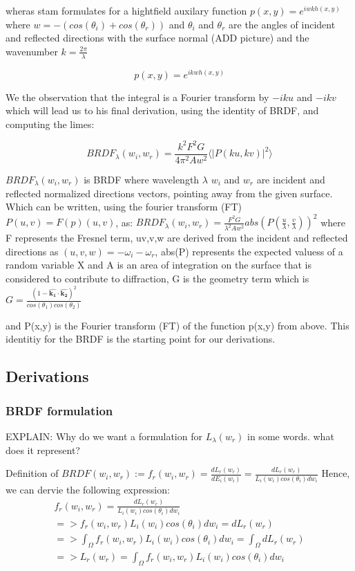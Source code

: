 wheras stam formulates for a hightfield auxilary function $p(x,y) = e^{iwkh(x,y)}$ where $w = -(cos(\theta_i)+cos(\theta_r))$ and $\theta_i$ and $\theta_r$ are the angles of incident and reflected directions with the surface normal (ADD picture) and the wavenumber $k=\frac{2\pi}{\lambda}$

\begin{equation}
    p(x,y) = e^{ikwh(x,y)}
\end{equation}

We the observation that the integral is a Fourier transform by $-iku$ and $-ikv$
which will lead us to his final derivation, using the identity of BRDF, and computing the limes:

\begin{equation}
    BRDF_{\lambda}(w_i, w_r) = \frac{k^2 F^2 G}{4\pi^2 A w^2} \langle \left|P(ku, kv)\right|^2\rangle
\end{equation}

$BRDF_{\lambda}(w_i, w_r)$ is BRDF where wavelength $\lambda$ $w_i$ and $w_r$ are incident and reflected normalized directions vectors, pointing away from the given surface. Which can be written, using the fourier transform (FT) $P(u,v) = F(p)(u,v)$, as:
$BRDF_{\lambda}(w_i, w_r) = \frac{F^2 G}{\lambda^2 A w^2}abs(P(\frac{u}{\lambda},\frac{v}{\lambda}))^2$ where F represents the Fresnel term, uv,v,w are derived from the incident and reflected directions as $(u,v,w) = -\omega_i - \omega_r$, abs(P) represents the expected valuess of a random variable X and A is an area of integration on the surface that is considered to contribute to diffraction, G is the geometry term which is $G   =\frac{(1-\hat{\mathbf{k_1}}\cdot\hat{\mathbf{k_2}})^2}{cos(\theta_1)cos(\theta_2)}$

and P(x,y) is the Fourier transform (FT) of the function p(x,y) from above.
This identitiy for the BRDF is the starting point for our derivations.


\subsection{Derivations}
\subsubsection{BRDF formulation}

EXPLAIN: Why do we want a formulation for $L_{\lambda}(w_r)$ in some words. what does it represent?

Definition of $BRDF(w_i, w_r) := f_r(w_i, w_r) = \frac{dL_r(w_r)}{dE_i(w_i)}=\frac{dL_r(w_r)}{L_i(w_i)cos(\theta_i)dw_i}$  
Hence, we can dervie the following expression:
\begin{align*}
f_r(w_i, w_r) = \frac{dL_r(w_r)}{L_i(w_i)cos(\theta_i)dw_i} \\
=> f_r(w_i, w_r) L_i(w_i)cos(\theta_i)dw_i = dL_r(w_r) \\
=> \int_{\Omega}f_r(w_i, w_r) L_i(w_i)cos(\theta_i)dw_i = \int_{\Omega}dL_r(w_r) \\
=> L_r(w_r) = \int_{\Omega}f_r(w_i, w_r) L_i(w_i)cos(\theta_i)dw_i
\end{align*}

